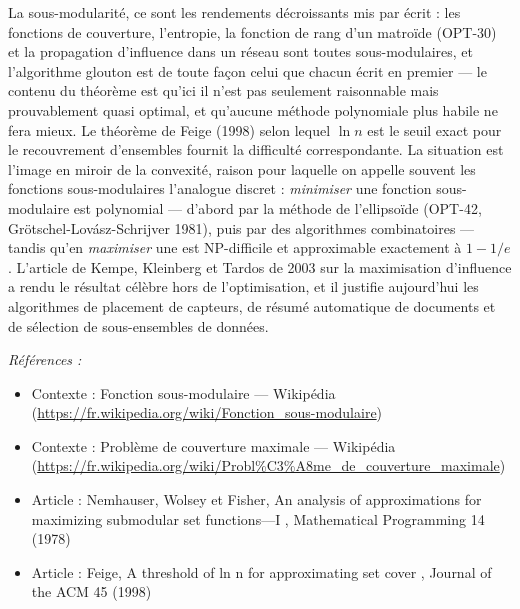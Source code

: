 \documentclass[11pt]{article}
\newenvironment{refs}{\par\small\noindent\emph{Références :}\begin{itemize}\setlength\itemsep{0pt}}{\end{itemize}\normalsize}
\begin{document}
\noindent La sous-modularité, ce sont les rendements décroissants mis par écrit : les fonctions de couverture, l'entropie, la fonction de rang d'un matroïde (OPT-30) et la propagation d'influence dans un réseau sont toutes sous-modulaires, et l'algorithme glouton est de toute façon celui que chacun écrit en premier --- le contenu du théorème est qu'ici il n'est pas seulement raisonnable mais prouvablement quasi optimal, et qu'aucune méthode polynomiale plus habile ne fera mieux. Le théorème de Feige (1998) selon lequel $\ln n$ est le seuil exact pour le recouvrement d'ensembles fournit la difficulté correspondante. La situation est l'image en miroir de la convexité, raison pour laquelle on appelle souvent les fonctions sous-modulaires l'analogue discret : \textit{minimiser} une fonction sous-modulaire est polynomial --- d'abord par la méthode de l'ellipsoïde (OPT-42, Grötschel-Lovász-Schrijver 1981), puis par des algorithmes combinatoires --- tandis qu'en \textit{maximiser} une est NP-difficile et approximable exactement à $1 - 1/e$. L'article de Kempe, Kleinberg et Tardos de 2003 sur la maximisation d'influence a rendu le résultat célèbre hors de l'optimisation, et il justifie aujourd'hui les algorithmes de placement de capteurs, de résumé automatique de documents et de sélection de sous-ensembles de données.

\begin{refs}
\item Contexte : Fonction sous-modulaire --- Wikipédia (\url{https://fr.wikipedia.org/wiki/Fonction_sous-modulaire})
\item Contexte : Problème de couverture maximale --- Wikipédia (\url{https://fr.wikipedia.org/wiki/Probl%C3%A8me_de_couverture_maximale})
\item Article : Nemhauser, Wolsey et Fisher, \og{} An analysis of approximations for maximizing submodular set functions---I \fg{}, Mathematical Programming 14 (1978)
\item Article : Feige, \og{} A threshold of ln n for approximating set cover \fg{}, Journal of the ACM 45 (1998)
\end{refs}

\bigskip
\end{document}

